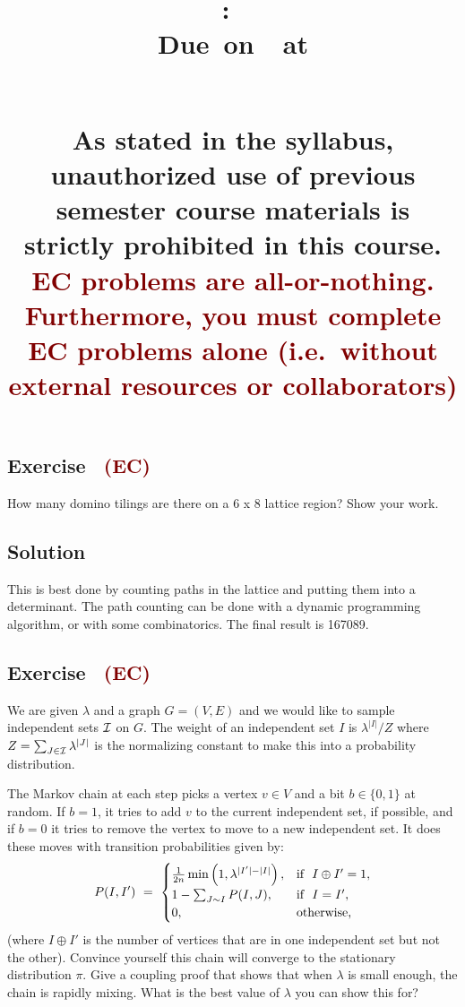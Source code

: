 \documentclass{article}
\title{
    \vspace{2in}
    \textbf{\hmwkClass:\ \hmwkTitle}\\
    \normalsize\vspace{0.1in}\small{Due\ on\ \hmwkDueDate\ at \hmwkDueTime}\\
    \vspace{0.1in}\large{\textit{\hmwkClassInstructor\ \hmwkSection}} \\
    \vspace{0.8in}
    \begin{minipage}[t]{0.4\columnwidth}
        {\footnotesize\textbf{As stated in the syllabus, unauthorized use of previous semester course materials is strictly prohibited in this course. \textcolor{Maroon}{EC problems are all-or-nothing. Furthermore, you must complete EC problems alone (i.e.\ without external resources or collaborators)}
        }}
    \vspace{0.5in}
    \end{minipage}
    \vspace{0.8in}
    \author{\textbf{\hmwkAuthorName}}
    \date{}
}
\newcounter{counter}
\newcommand{\Exercise}{Exercise \stepcounter{counter}\thecounter}
\begin{document}
\maketitle

\pagebreak

\subsection*{\Exercise\ \textcolor{Maroon}{(EC)}}
    How many domino tilings are there on a 6 x 8 lattice region? Show your work.

\subsection*{Solution}
  This is best done by counting paths in the lattice and putting them into a
  determinant. The path counting can be done with a dynamic programming
  algorithm, or with some combinatorics.  The final result is 167089.


\subsection*{\Exercise\ \textcolor{Maroon}{(EC)}}
  We are given $\lambda$ and a graph $G=(V, E)$ and we would like to sample
  independent sets ${\cal{I}}$ on $G$.  The weight of an independent set $I$
  is $\lambda^{|I|}/Z$ where $Z = \sum_{J \in {\cal{I}}} \lambda^{|J|}$ is the
  normalizing constant to make this into a probability distribution.  

   \vspace{3mm}
  The Markov chain at each step picks a vertex $v \in V$ and a bit
  $b \in \{0, 1\}$ at random. If $b = 1$, it tries to add $v$ to the current independent set, if
  possible, and if $b=0$ it tries to remove the vertex to move to a new
  independent set.  It does these moves with transition probabilities given
  by:
   $$P(I,I') \ =\ 
   \begin{cases} \frac{1}{2n} \min\left( 1,
     \lambda^{|I'|-|I|}\right), & \hbox{if \ } I\oplus I'=1,\cr 1-\sum_{J\sim
     I} P(I,J), & \hbox{if \ } I=I',\cr 0, & \hbox{otherwise, \ }\cr
   \end{cases}$$
  (where $I \oplus I'$ is the number of vertices that are in one independent set
  but not the other).  Convince yourself this chain will converge to the
  stationary distribution $\pi$.  Give a coupling proof that shows that when
  $\lambda$ is small enough, the chain is rapidly mixing.  What is the best
  value of $\lambda$ you can show this for?
\end{document}
